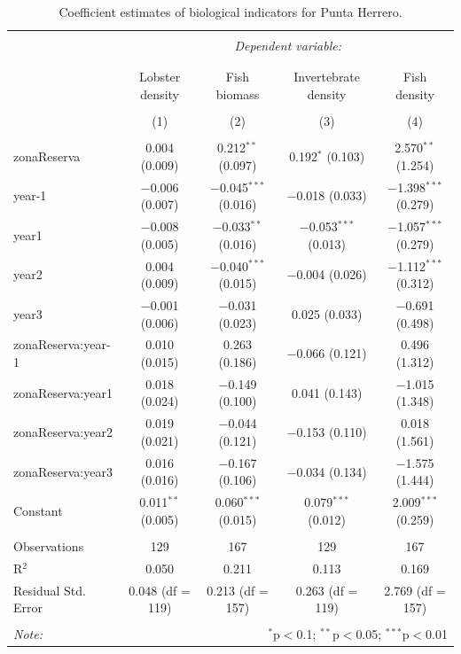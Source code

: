 \documentclass[10pt]{article}
\begin{document}
\begin{table}[h] \centering 
  \caption{Coefficient estimates of biological indicators for Punta Herrero.} 
  \label{} 
\small 
\begin{tabular}{@{\extracolsep{1pt}}lcccc} 
\\[-1.8ex]\hline 
\hline \\[-1.8ex] 
 & \multicolumn{4}{c}{\textit{Dependent variable:}} \\ 
\cline{2-5} 
\\[-1.8ex] & \multicolumn{4}{c}{} \\ 
 & Lobster density & Fish biomass & Invertebrate density & Fish density \\ 
\\[-1.8ex] & (1) & (2) & (3) & (4)\\ 
\hline \\[-1.8ex] 
 zonaReserva & 0.004 (0.009) & 0.212$^{**}$ (0.097) & 0.192$^{*}$ (0.103) & 2.570$^{**}$ (1.254) \\ 
  year-1 & $-$0.006 (0.007) & $-$0.045$^{***}$ (0.016) & $-$0.018 (0.033) & $-$1.398$^{***}$ (0.279) \\ 
  year1 & $-$0.008 (0.005) & $-$0.033$^{**}$ (0.016) & $-$0.053$^{***}$ (0.013) & $-$1.057$^{***}$ (0.279) \\ 
  year2 & 0.004 (0.009) & $-$0.040$^{***}$ (0.015) & $-$0.004 (0.026) & $-$1.112$^{***}$ (0.312) \\ 
  year3 & $-$0.001 (0.006) & $-$0.031 (0.023) & 0.025 (0.033) & $-$0.691 (0.498) \\ 
  zonaReserva:year-1 & 0.010 (0.015) & 0.263 (0.186) & $-$0.066 (0.121) & 0.496 (1.312) \\ 
  zonaReserva:year1 & 0.018 (0.024) & $-$0.149 (0.100) & 0.041 (0.143) & $-$1.015 (1.348) \\ 
  zonaReserva:year2 & 0.019 (0.021) & $-$0.044 (0.121) & $-$0.153 (0.110) & 0.018 (1.561) \\ 
  zonaReserva:year3 & 0.016 (0.016) & $-$0.167 (0.106) & $-$0.034 (0.134) & $-$1.575 (1.444) \\ 
  Constant & 0.011$^{**}$ (0.005) & 0.060$^{***}$ (0.015) & 0.079$^{***}$ (0.012) & 2.009$^{***}$ (0.259) \\ 
 \hline \\[-1.8ex] 
Observations & 129 & 167 & 129 & 167 \\ 
R$^{2}$ & 0.050 & 0.211 & 0.113 & 0.169 \\ 
Residual Std. Error & 0.048 (df = 119) & 0.213 (df = 157) & 0.263 (df = 119) & 2.769 (df = 157) \\ 
\hline 
\hline \\[-1.8ex] 
\textit{Note:}  & \multicolumn{4}{r}{$^{*}$p$<$0.1; $^{**}$p$<$0.05; $^{***}$p$<$0.01} \\ 
\end{tabular} 
\end{table} 
\end{document}
